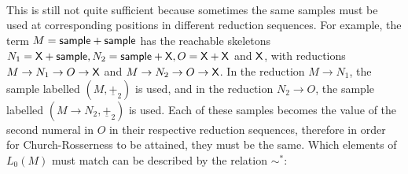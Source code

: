 \paragraph{}
This is still not quite sufficient because sometimes the same samples must be used at corresponding positions in different reduction sequences. For example, the term $M = \mathsf{sample} + \mathsf{sample}$ has the reachable skeletons $N_1 = \mathsf{X} + \mathsf{sample}, N_2 = \mathsf{sample} + \mathsf{X}, O = \mathsf{X} + \mathsf{X}$ and $\mathsf{X}$, with reductions $M \to N_1 \to O \to \mathsf{X}$ and $M \to N_2 \to O \to \mathsf{X}$. In the reduction $M \to N_1$, the sample labelled $(M, \underline{+}_2)$ is used, and in the reduction $N_2 \to O$, the sample labelled $(M \to N_2, \underline{+}_2)$ is used. Each of these samples becomes the value of the second numeral in $O$ in their respective reduction sequences, therefore in order for Church-Rosserness to be attained, they must be the same. Which elements of $L_0(M)$ must match can be described by the relation $\sim^*$:

